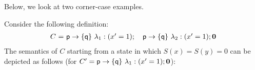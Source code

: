 Below, we look at two corner-case examples.
\begin{example}
  Consider the following definition:
  \begin{displaymath}
    \begin{array}{lll}
      C \ {=}\ \mathsf{p}\rightarrow \{\mathsf{q}\}\ \lambda_1: (x'=1);\quad \mathsf{p}\rightarrow \{\mathsf{q}\}\ \lambda_2: (x'=1);\mathbf{0}
    \end{array}
  \end{displaymath}
  The semantics of $C$ starting from a state in which $S(x)=S(y)=0$
  can be depicted as follows (for
  $C'= \mathsf{p}\rightarrow \{\mathsf{q}\}\ \lambda_1: (x'=1);\mathbf{0}$):

\bigskip

\end{example}

